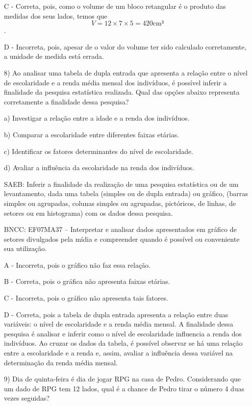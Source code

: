C - Correta, pois, como o volume de um bloco retangular é o produto das
medidas dos seus lados, temos que
\[V = 12 \times 7 \times 5 = 420\text{cm}³\].

D - Incorreta, pois, apesar de o valor do volume ter sido calculado
corretamente, a unidade de medida está errada.

8) Ao analisar uma tabela de dupla entrada que apresenta a relação entre
o nível de escolaridade e a renda média mensal dos indivíduos, é
possível inferir a finalidade da pesquisa estatística realizada. Qual
das opções abaixo representa corretamente a finalidade dessa pesquisa?

a) Investigar a relação entre a idade e a renda dos indivíduos.

b) Comparar a escolaridade entre diferentes faixas etárias.

c) Identificar os fatores determinantes do nível de escolaridade.

d) Avaliar a influência da escolaridade na renda dos indivíduos.

SAEB: Inferir a finalidade da realização de uma pesquisa estatística ou
de um levantamento, dada uma tabela (simples ou de dupla entrada) ou
gráfico, (barras simples ou agrupadas, colunas simples ou agrupadas,
pictóricos, de linhas, de setores ou em histograma) com os dados dessa
pesquisa.

BNCC: EF07MA37 -- Interpretar e analisar dados apresentados em gráfico
de setores divulgados pela mídia e compreender quando é possível ou
conveniente sua utilização.

A - Incorreta, pois o gráfico não faz essa relação.

B - Correta, pois o gráfica não apresenta faixas etárias.

C - Incorreta, pois o gráfico não apresenta tais fatores.

D - Correta, pois a tabela de dupla entrada apresenta a relação entre
duas variáveis: o nível de escolaridade e a renda média mensal. A
finalidade dessa pesquisa é analisar e inferir como o nível de
escolaridade influencia a renda dos indivíduos. Ao cruzar os dados da
tabela, é possível observar se há uma relação entre a escolaridade e a
renda e, assim, avaliar a influência dessa variável na determinação da
renda média mensal.

9) Dia de quinta-feira é dia de jogar RPG na casa de Pedro. Considerando
que um dado de RPG tem 12 lados, qual é a chance de Pedro tirar o número
4 duas vezes seguidas?

